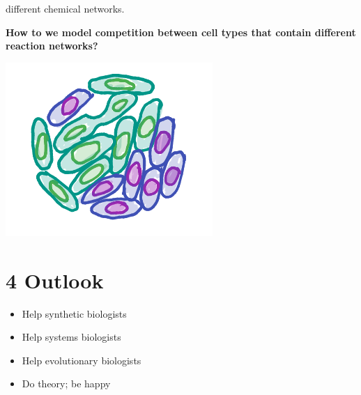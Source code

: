 \documentclass[a0,portrait]{a0poster}
\begin{document}
\begin{multicols}{3}
different chemical networks.
\\
\begin{tcolorbox}[boxrule=2pt,arc=3.4pt,boxsep=2mm]
\begin{center}\color{DarkRed}
\textbf{How to we model competition between cell types that contain
different reaction networks?}
\end{center}
\end{tcolorbox}
\begin{center}
\includegraphics[width=0.9\linewidth]{competition}
\end{center}
\section*{4 Outlook}
\begin{itemize}
	\item Help synthetic biologists
	\item Help systems biologists
	\item Help evolutionary biologists
	\item Do theory; be happy
\end{itemize}
\vfill\null
\columnbreak

\end{multicols}
\end{document}
